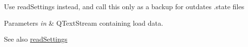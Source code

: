 
\begin{DoxyRefList}
\item[\label{deprecated__deprecated000001}%
\hypertarget{deprecated__deprecated000001}{}%
Member \hyperlink{classGlobalSearch_1_1Structure_aa9ede9f516912b34000000caa849689c}{Global\+Search\+:\+:Structure\+:\+:load} (Q\+Text\+Stream \&in)]Use read\+Settings instead, and call this only as a backup for outdates .state files 
\begin{DoxyParams}{Parameters}
{\em in} & Q\+Text\+Stream containing load data. \\
\hline
\end{DoxyParams}
\begin{DoxySeeAlso}{See also}
\hyperlink{classGlobalSearch_1_1Structure_a352a550ebb2c8e511e3ad400a98b1373}{read\+Settings} 
\end{DoxySeeAlso}

\end{DoxyRefList}